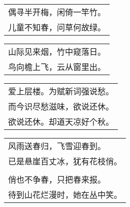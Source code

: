 \nopagebreak%
\nopagebreak%
\noindent\begin{minipage}{\linewidth}
  \vskip-3pt\begin{table}[H]
    \centering
    \begin{tabular}{@{}l@{}}
偶寻半开梅，闲倚一竿竹。\\
儿童不知春，问草何故绿。
    \end{tabular}
  \end{table}
\end{minipage}
\vspace{1cm}


\nopagebreak%
\nopagebreak%
\noindent\begin{minipage}{\linewidth}
  \vskip-3pt\begin{table}[H]
    \centering
    \begin{tabular}{@{}l@{}}
山际见来烟，竹中窥落日。\\
鸟向檐上飞，云从窗里出。
    \end{tabular}
  \end{table}
\end{minipage}
\vspace{1cm}


\nopagebreak%
\nopagebreak%
\noindent\begin{minipage}{\linewidth}
  \vskip-3pt\begin{table}[H]
    \centering
    \begin{tabular}{@{}l@{}}
爱上层楼。为赋新词强说愁。\\
而今识尽愁滋味，欲说还休。\\
欲说还休。却道天凉好个秋。
    \end{tabular}
  \end{table}
\end{minipage}
\vspace{1cm}


\nopagebreak%
\nopagebreak%
\noindent\begin{minipage}{\linewidth}
  \vskip-3pt\begin{table}[H]
    \centering
    \begin{tabular}{@{}l@{}}
风雨送春归，飞雪迎春到。\\
已是悬崖百丈冰，犹有花枝俏。\\
\\
俏也不争春，只把春来报。\\
待到山花烂漫时，她在丛中笑。
    \end{tabular}
  \end{table}
\end{minipage}
\vspace{1cm}


